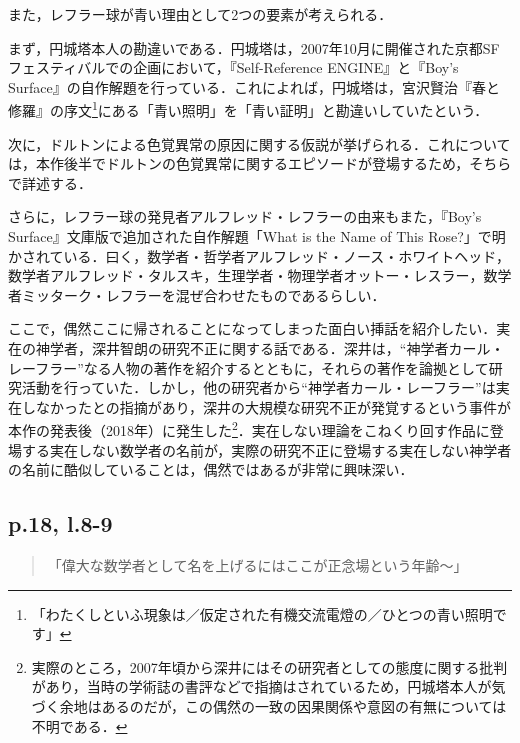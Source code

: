 \documentclass[10pt, a5paper, twoside]{jsarticle}
\theoremstyle{definition}
\begin{document}
                また，レフラー球が青い理由として2つの要素が考えられる．

                まず，円城塔本人の勘違いである．円城塔は，2007年10月に開催された京都SFフェスティバルでの企画において，『Self-Reference ENGINE』と『Boy's Surface』の自作解題\cite{sri}を行っている．これによれば，円城塔は，宮沢賢治『春と修羅』の序文\footnote{「わたくしといふ現象は／仮定された有機交流電燈の／ひとつの青い照明です」\cite{myz}}にある「青い照明」を「青い証明」と勘違いしていたという．

                次に，ドルトンによる色覚異常の原因に関する仮説が挙げられる．これについては，本作後半でドルトンの色覚異常に関するエピソードが登場するため，そちらで詳述する．

                さらに，レフラー球の発見者アルフレッド・レフラーの由来もまた，『Boy's Surface』文庫版で追加された自作解題「What is the Name of This Rose?」で明かされている．曰く，数学者・哲学者アルフレッド・ノース・ホワイトヘッド，数学者アルフレッド・タルスキ，生理学者・物理学者オットー・レスラー，数学者ミッターク・レフラーを混ぜ合わせたものであるらしい．

                ここで，偶然ここに帰されることになってしまった面白い挿話を紹介したい．実在の神学者，深井智朗の研究不正に関する話である．深井は，“神学者カール・レーフラー”なる人物の著作を紹介するとともに，それらの著作を論拠として研究活動を行っていた．しかし，他の研究者から“神学者カール・レーフラー”は実在しなかったとの指摘があり，深井の大規模な研究不正が発覚するという事件が本作の発表後（2018年）に発生した\footnote{実際のところ，2007年頃から深井にはその研究者としての態度に関する批判があり\cite{yskt}，当時の学術誌の書評などで指摘はされているため，円城塔本人が気づく余地はあるのだが，この偶然の一致の因果関係や意図の有無については不明である．}\cite{ntz}．実在しない理論をこねくり回す作品に登場する実在しない数学者の名前が，実際の研究不正に登場する実在しない神学者の名前に酷似していることは，偶然ではあるが非常に興味深い．

            \subsection{p.18, l.8-9}

                \begin{quote}

                    「偉大な数学者として名を上げるにはここが正念場という年齢〜」

                \end{quote}
\end{document}
